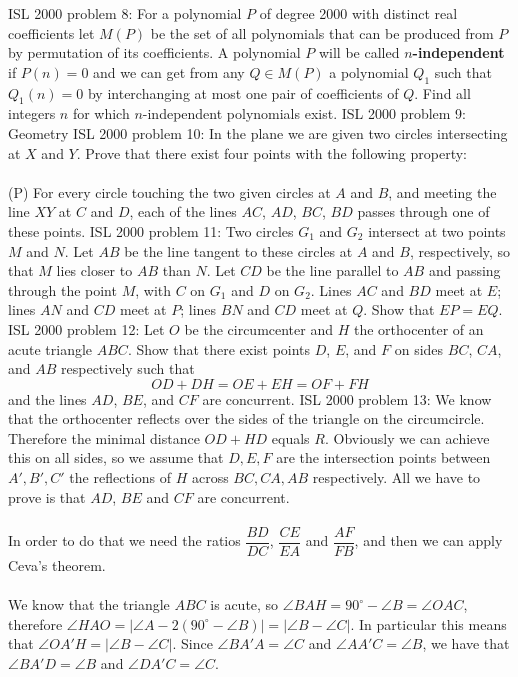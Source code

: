 ISL 2000 problem 8:  For a polynomial $ P$ of degree 2000 with distinct real coefficients let $ M(P)$ be the set of all polynomials that can be produced from $ P$ by permutation of its coefficients. A polynomial $ P$ will be called \textbf{$ n$-independent} if $ P(n) = 0$ and we can get from any $ Q \in M(P)$ a polynomial $ Q_1$ such that $ Q_1(n) = 0$ by interchanging at most one pair of coefficients of $ Q.$ Find all integers $ n$ for which $ n$-independent polynomials exist. 
ISL 2000 problem 9:  Geometry 
ISL 2000 problem 10:  In the plane we are given two circles intersecting at $ X$ and $ Y$. Prove that there exist four points with the following property: \\\\
(P) For every circle touching the two given circles at $ A$ and $ B$, and meeting the line $ XY$ at $ C$ and $ D$, each of the lines $ AC$, $ AD$, $ BC$, $ BD$ passes through one of these points. 
ISL 2000 problem 11:  Two circles $ G_1$ and $ G_2$ intersect at two points $ M$ and $ N$. Let $ AB$ be the line tangent to these circles at $ A$ and $ B$, respectively, so that $ M$ lies closer to $ AB$ than $ N$. Let $ CD$ be the line parallel to $ AB$ and passing through the point $ M$, with $ C$ on $ G_1$ and $ D$ on $ G_2$. Lines $ AC$ and $ BD$ meet at $ E$; lines $ AN$ and $ CD$ meet at $ P$; lines $ BN$ and $ CD$ meet at $ Q$. Show that $ EP = EQ$. 
ISL 2000 problem 12:  Let $O$ be the circumcenter and $H$ the orthocenter of an acute triangle $ABC$.  Show that there exist points $D$, $E$, and $F$ on sides $BC$, $CA$, and $AB$ respectively such that
\[ OD + DH = OE + EH = OF + FH \]
and the lines $AD$, $BE$, and $CF$ are concurrent. 
ISL 2000 problem 13:  We know that the orthocenter reflects over the sides of the triangle on the circumcircle. Therefore the minimal distance $ OD+HD$ equals $ R$. Obviously we can achieve this on all sides, so we assume that $ D,E,F$ are the intersection points between $ A',B',C'$ the reflections of $ H$ across $ BC,CA,AB$ respectively. All we have to prove is that $ AD$, $ BE$ and $ CF$ are concurrent. \\\\
In order to do that we need the ratios $ \dfrac {BD}{DC}$, $ \dfrac {CE}{EA}$ and $ \dfrac {AF}{FB}$, and then we can apply Ceva's theorem. \\\\
We know that the triangle $ ABC$ is acute, so $ \angle BAH = 90^\circ- \angle B = \angle OAC$, therefore $ \angle HAO = |\angle A - 2(90^\circ -\angle B)| = |\angle B- \angle C|$. In particular this means that $ \angle OA'H = |\angle B-\angle C|$. Since $ \angle BA'A = \angle C$ and $ \angle AA'C = \angle B$, we have that $ \angle BA'D = \angle B$ and $ \angle DA'C = \angle C$. \\\\
